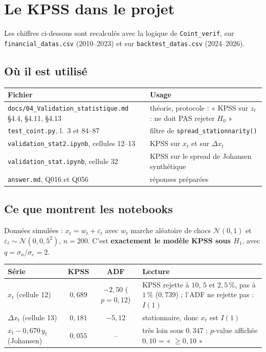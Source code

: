 \documentclass[11pt,a4paper]{article}
\newcommand{\code}[1]{\texttt{#1}}
\theoremstyle{definition}
\begin{document}
\section{Le KPSS dans le projet}\label{sec:projet}

Les chiffres ci-dessous sont recalculés avec la logique de \code{Coint\_verif}, sur \code{financial\_datas.csv} (2010--2023) et sur \code{backtest\_datas.csv} (2024--2026).

\subsection{Où il est utilisé}

\begin{center}
\begin{tabularx}{\textwidth}{@{}lX@{}}
\toprule
Fichier & Usage \\
\midrule
\code{docs/04\_Validation\_statistique.md} \S4.4, \S4.11, \S4.13 & théorie, protocole : « KPSS sur $z_t$ : ne doit PAS rejeter $H_0$ » \\
\code{test\_coint.py}, l.~3 et 84--87 & filtre de \code{spread\_stationnarity()} \\
\code{validation\_stat2.ipynb}, cellules 12--13 & KPSS sur $x_t$ et sur $\Delta x_t$ \\
\code{validation\_stat.ipynb}, cellule 32 & KPSS sur le spread de Johansen synthétique \\
\code{answer.md}, Q016 et Q056 & réponses préparées \\
\bottomrule
\end{tabularx}
\end{center}

\subsection{Ce que montrent les notebooks}

Données simulées : $x_t = w_t + \varepsilon_t$ avec $w_t$ marche aléatoire de chocs $\mathcal N(0,1)$ et $\varepsilon_t \sim \mathcal N(0, 0{,}5^2)$, $n = 200$. C'est \textbf{exactement le modèle KPSS sous $H_1$}, avec $q = \sigma_u/\sigma_\varepsilon = 2$.

\begin{center}
\begin{tabularx}{\textwidth}{@{}lccX@{}}
\toprule
Série & KPSS & ADF & Lecture \\
\midrule
$x_t$ (cellule 12) & $0{,}689$ & $-2{,}50$ ($p = 0{,}12$) & KPSS rejette à $10$, $5$ et $2{,}5\,\%$, pas à $1\,\%$ ($0{,}739$) ; l'ADF ne rejette pas : $I(1)$ \\
$\Delta x_t$ (cellule 13) & $0{,}181$ & $-5{,}12$ & stationnaire, donc $x_t$ est $I(1)$ \\
$x_t - 0{,}670\,y_t$ (Johansen) & $0{,}055$ & -- & très loin sous $0{,}347$ ; $p$-value affichée $0{,}10$ = « $\ge 0{,}10$ » \\
\bottomrule
\end{tabularx}
\end{center}
\end{document}
